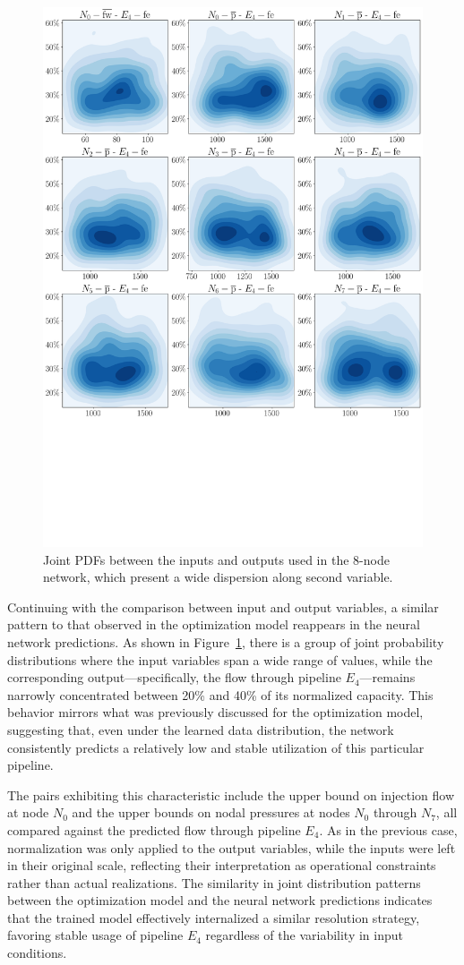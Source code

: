 \begin{figure}
    \begin{center}
        \includegraphics[width=.65\textwidth]{figures/Chapter_NonLinealCensnet/inputs_outputs_1 KDE.png}
    \end{center}
    \caption{Joint PDFs between the inputs and outputs used in the 8-node network, which present a wide dispersion along second variable. }
    \label{fig:joint_distributions_inputs_outputs_1_KDE}
\end{figure}

Continuing with the comparison between input and output variables, a similar pattern to that observed in the optimization model reappears in the neural network predictions. As shown in Figure~\cref{fig:joint_distributions_inputs_outputs_1_KDE}, there is a group of joint probability distributions where the input variables span a wide range of values, while the corresponding output—specifically, the flow through pipeline $E_4$—remains narrowly concentrated between 20\% and 40\% of its normalized capacity. This behavior mirrors what was previously discussed for the optimization model, suggesting that, even under the learned data distribution, the network consistently predicts a relatively low and stable utilization of this particular pipeline.

The pairs exhibiting this characteristic include the upper bound on injection flow at node $N_0$ and the upper bounds on nodal pressures at nodes $N_0$ through $N_7$, all compared against the predicted flow through pipeline $E_4$. As in the previous case, normalization was only applied to the output variables, while the inputs were left in their original scale, reflecting their interpretation as operational constraints rather than actual realizations. The similarity in joint distribution patterns between the optimization model and the neural network predictions indicates that the trained model effectively internalized a similar resolution strategy, favoring stable usage of pipeline $E_4$ regardless of the variability in input conditions.



